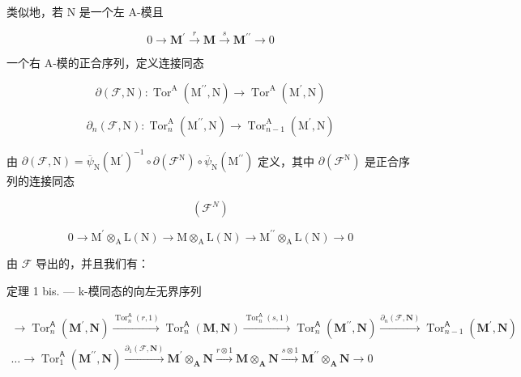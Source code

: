 类似地，若 N 是一个左 A-模且

\[
0 \to \mathbf {M} ^ {\prime} \xrightarrow {r} \mathbf {M} \xrightarrow {s} \mathbf {M} ^ {\prime \prime} \to 0\tag{F}
\]

一个右 A-模的正合序列，定义连接同态

\[
\partial (\mathcal {F}, \mathrm{N}): \operatorname{Tor} ^ {\mathrm{A}} \left(\mathrm{M} ^ {\prime \prime}, \mathrm{N}\right)\rightarrow \operatorname{Tor} ^ {\mathrm{A}} \left(\mathrm{M} ^ {\prime}, \mathrm{N}\right)
\]

\[
\partial_ {n} (\mathcal {F}, \mathrm{N}): \operatorname{Tor} _ {n} ^ {\mathrm{A}} \left(\mathrm{M} ^ {\prime \prime}, \mathrm{N}\right)\rightarrow \operatorname{Tor} _ {n - 1} ^ {\mathrm{A}} \left(\mathrm{M} ^ {\prime}, \mathrm{N}\right)
\]

由 \(\partial(\mathcal{F},\mathrm{N})=\overline{\psi}_{\mathrm{N}}(\mathrm{M}^{\prime})^{-1}\circ\partial(\mathcal{F}^{\mathrm{N}})\circ\overline{\psi}_{\mathrm{N}}(\mathrm{M}^{\prime\prime})\) 定义，其中 \(\partial(\mathcal{F}^{\mathrm{N}})\) 是正合序列的连接同态

\[
(\mathcal {F} ^ {N})
\]

\[
0 \rightarrow \mathrm{M} ^ {\prime} \otimes_ {\mathrm{A}} \mathrm{L} (\mathrm{N}) \rightarrow \mathrm{M} \otimes_ {\mathrm{A}} \mathrm{L} (\mathrm{N}) \rightarrow \mathrm{M} ^ {\prime \prime} \otimes_ {\mathrm{A}} \mathrm{L} (\mathrm{N}) \rightarrow 0
\]

由 \(\mathcal{F}\) 导出的，并且我们有：

定理 1 bis. --- k-模同态的向左无界序列

\[
\begin{array}{l}\rightarrow \operatorname{Tor} _ {n} ^ {\mathsf {A}} (\mathbf {M} ^ {\prime}, \mathbf {N}) \xrightarrow {\operatorname{Tor} _ {n} ^ {\mathsf {A}} (r , 1)} \operatorname{Tor} _ {n} ^ {\mathsf {A}} (\mathbf {M}, \mathbf {N}) \xrightarrow {\operatorname{Tor} _ {n} ^ {\mathsf {A}} (s , 1)} \operatorname{Tor} _ {n} ^ {\mathsf {A}} (\mathbf {M} ^ {\prime \prime}, \mathbf {N}) \xrightarrow {\partial_ {n} (\mathcal {F} , \mathbf {N})} \operatorname{Tor} _ {n - 1} ^ {\mathsf {A}} (\mathbf {M} ^ {\prime}, \mathbf {N})\\\dots \rightarrow \operatorname{Tor} _ {1} ^ {\mathsf {A}} (\mathbf {M} ^ {\prime \prime}, \mathbf {N}) \xrightarrow {\partial_ {1} (\mathcal {F} , \mathbf {N})} \mathbf {M} ^ {\prime} \otimes_ {\mathbf {A}} \mathbf {N} \xrightarrow {r \otimes 1} \mathbf {M} \otimes_ {\mathbf {A}} \mathbf {N} \xrightarrow {s \otimes 1} \mathbf {M} ^ {\prime \prime} \otimes_ {\mathbf {A}} \mathbf {N} \longrightarrow 0\end{array}
\]

